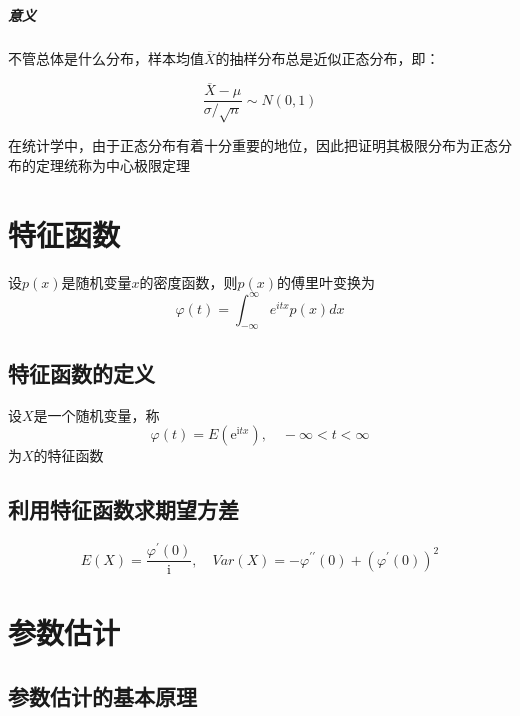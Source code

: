 \documentclass[UTF8,10pt]{book}
\begin{document}
                \paragraph{意义} {\kaishu 不管总体是什么分布，样本均值$\overline{X}$的抽样分布总是近似正态分布，即：}

                $$ \frac{\overline{X} - \mu}{\sigma / \sqrt{n}} \sim N(0,1) $$

                {\kaishu 在统计学中，由于正态分布有着十分重要的地位，因此把证明其极限分布为正态分布的定理统称为中心极限定理}



            







\clearpage
\chapter{特征函数}
 设$p(x)$是随机变量$x$的密度函数，则$p(x)$的傅里叶变换为 $$ \varphi(t)=\int_{-\infty}^{\infty} e^{i t x} p(x) d x $$
 \section{特征函数的定义}
 设$X$是一个随机变量，称 $$ \varphi(t)=E\left(\mathrm{e}^{\mathrm{i} t x}\right), \quad-\infty<t<\infty $$
 为$X$的特征函数
 
 \section{利用特征函数求期望方差}
 $$ E(X)=\frac{\varphi^{\prime}(0)}{\mathrm{i}}, \quad Var(X)=-\varphi^{\prime \prime}(0)+\left(\varphi^{\prime}(0)\right)^{2} $$
 
\chapter{参数估计}

    \section{参数估计的基本原理}
\end{document}
